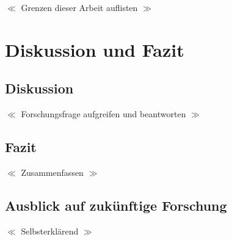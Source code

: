 \documentclass{scrartcl}
\begin{document}
$\ll$ Grenzen dieser Arbeit auflisten $\gg$

\section{Diskussion und Fazit}

\subsection{Diskussion}

$\ll$ Forschungsfrage aufgreifen und beantworten $\gg$

\subsection{Fazit}

$\ll$ Zusammenfassen $\gg$

\subsection{Ausblick auf zukünftige Forschung}

$\ll$ Selbsterklärend $\gg$

\printbibliography

\listoffigures
\listoftables
\end{document}
